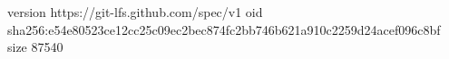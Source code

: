 version https://git-lfs.github.com/spec/v1
oid sha256:e54e80523ce12cc25c09ec2bec874fc2bb746b621a910c2259d24acef096c8bf
size 87540
